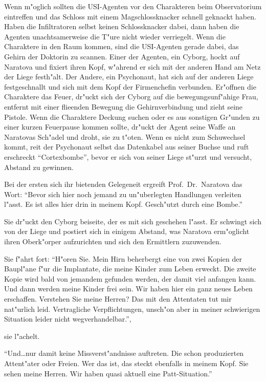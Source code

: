 Wenn m"oglich sollten die USI-Agenten vor den Charakteren beim Observatorium eintreffen und das Schloss mit einem Magschlossknacker schnell geknackt haben. Haben die Infiltratoren selbst keinen Schlossknacker dabei, dann haben die Agenten unachtsamerweise die T"ure nicht wieder verriegelt. Wenn die Charaktere in den Raum kommen, sind die USI-Agenten gerade dabei, das Gehirn der Doktorin zu scannen. Einer der Agenten, ein Cyborg, hockt auf Naratova und fixiert ihren Kopf, w"ahrend er sich mit der anderen Hand am Netz der Liege festh"alt. Der Andere, ein Psychonaut, hat sich auf der anderen Liege festgeschnallt und sich mit dem Kopf der Firmenchefin verbunden. Er"offnen die Charaktere das Feuer, dr"uckt sich der Cyborg auf die bewegungsunf"ahige Frau, entfernt mit einer flie\3enden Bewegung die Gehirnverbindung und zieht seine Pistole. Wenn die Charaktere Deckung suchen oder es aus sonstigen Gr"unden zu einer kurzen Feuerpause kommen sollte, dr"uckt der Agent seine Waffe an Naratovas Sch"adel und droht, sie zu t"oten. Wenn es nicht zum Schu\3wechsel kommt, rei\3t der Psychonaut selbst das Datenkabel aus seiner Buchse und ruft erschreckt "`Cortexbombe"', bevor er sich von seiner Liege st"urzt und versucht, Abstand zu gewinnen.

Bei der ersten sich ihr bietenden Gelegeneit ergreift Prof.~Dr.~Naratova das Wort: "`Bevor sich hier noch jemand zu un"uberlegten Handlungen verleiten l"asst. Es ist alles hier drin in meinem Kopf. Gesch"utzt durch eine Bombe."'

Sie dr"uckt den Cyborg beiseite, der es mit sich geschehen l"asst. Er schwingt sich von der Liege und postiert sich in einigem Abstand, was Naratova erm"oglicht ihren Oberk"orper aufzurichten und sich den Ermittlern zuzuwenden.

Sie f"ahrt fort: "`H"oren Sie. Mein Hirn beherbergt eine von zwei Kopien der Baupl"ane f"ur die Implantate, die meine Kinder zum Leben erweckt. Die zweite Kopie wird bald von jemandem gefunden werden, der damit viel anfangen kann. Und dann werden meine Kinder frei sein. Wir haben hier ein ganz neues Leben erschaffen. Verstehen Sie meine Herren? Das mit den Attentaten tut mir nat"urlich leid. Vertragliche Verpflichtungen, unsch"on aber in meiner schwierigen Situation leider nicht wegverhandelbar."',

sie l"achelt.

"`Und\dots{}nur damit keine Missverst"andnisse auftreten. Die schon produzierten Attent"ater oder Freien. Wer das ist, das steckt ebenfalls in meinem Kopf. Sie sehen meine Herren. Wir haben quasi aktuell eine Patt-Situation."'

